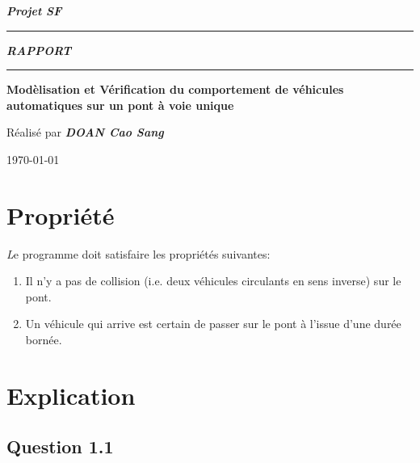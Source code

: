 \documentclass[a4paper,11pt]{report}
\begin{document}
	\begin{titlepage}
		\begin{center}
			\large\bfseries\itshape Projet SF\\
		\end{center}
		\noindent\rule{\linewidth}{3pt}

		\begin{center}
			\Huge\bfseries\itshape RAPPORT\\
		\end{center}
		
		\noindent\rule{\linewidth}{3pt}
		\begin{center}
			\bfseries
			\large Modèlisation et Vérification du comportement de véhicules automatiques sur un pont à voie unique
			
		\end{center}
		\begin{center}
			Réalisé par \bfseries \itshape DOAN Cao Sang
		\end{center}
		\begin{center}
			\today
		\end{center}
	\end{titlepage}

\chapter{Propriété}
	{\huge \itshape L}e programme doit satisfaire les propriétés suivantes:
		\begin{enumerate}
			\item Il n'y a pas de collision (i.e. deux véhicules circulants en sens inverse) sur le pont.
			\item Un véhicule qui arrive est certain de passer sur le pont à l'issue d'une durée bornée.
		\end{enumerate}
	
\chapter{Explication}
\section{Question 1.1}
\end{document}
